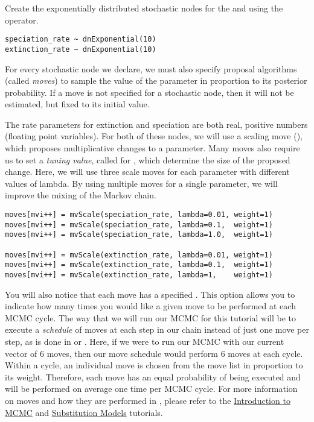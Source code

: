 Create the exponentially distributed stochastic nodes for the  and  using the \cl{\textasciitilde} operator.
{\tt \begin{snugshade*}
\begin{lstlisting}
speciation_rate ~ dnExponential(10)
extinction_rate ~ dnExponential(10)
\end{lstlisting}
\end{snugshade*}}

For every stochastic node we declare, we must also specify proposal algorithms (called \textit{moves}) to sample the value of the parameter in proportion to its posterior probability.
If a move is not specified for a stochastic node, then it will not be estimated, but fixed to its initial value. 

The rate parameters for extinction and speciation are both real, positive numbers (\IE floating point variables). 
For both of these nodes, we will use a scaling move (), which proposes multiplicative changes to a parameter.
Many moves also require us to set a \textit{tuning value}, called  for , which determine the size of the proposed change. 
Here, we will use three scale moves for each parameter with  different values of lambda. 
By using multiple moves for a single parameter, we will improve the mixing of the Markov chain. 
{\tt \begin{snugshade*}
\begin{lstlisting}
moves[mvi++] = mvScale(speciation_rate, lambda=0.01, weight=1)
moves[mvi++] = mvScale(speciation_rate, lambda=0.1,  weight=1)
moves[mvi++] = mvScale(speciation_rate, lambda=1.0,  weight=1)

moves[mvi++] = mvScale(extinction_rate, lambda=0.01, weight=1)
moves[mvi++] = mvScale(extinction_rate, lambda=0.1,  weight=1)
moves[mvi++] = mvScale(extinction_rate, lambda=1,    weight=1)
\end{lstlisting}
\end{snugshade*}}

You will also notice that each move has a specified . 
This option allows you to indicate how many times you would like a given move to be performed at each MCMC cycle. 
The way that we will run our MCMC for this tutorial will be to execute a \textit{schedule} of moves at each step in our chain instead of just one move per step, as is done in  \citep{Ronquist2003} or  \citep{Drummond2012,Bouckaert2014}.
Here, if we were to run our MCMC with our current vector of 6 moves, then our move schedule would perform 6 moves at each cycle.
Within a cycle, an individual move is chosen from the move list in proportion to its weight. 
Therefore, each move has an equal probability of being executed and will be performed on average one time per MCMC cycle. 
For more information on moves and how they are performed in \RevBayes, please refer to the \href{https://github.com/revbayes/revbayes_tutorial/blob/master/tutorial_TeX/RB_MCMC_Intro_Tutorial/RB_MCMC_Intro_Tutorial.pdf}{Introduction to MCMC} and \href{https://github.com/ssb2017/revbayes_intro/blob/master/tutorials/RB_CTMC_Tutorial.pdf}{Substitution Models} tutorials.

